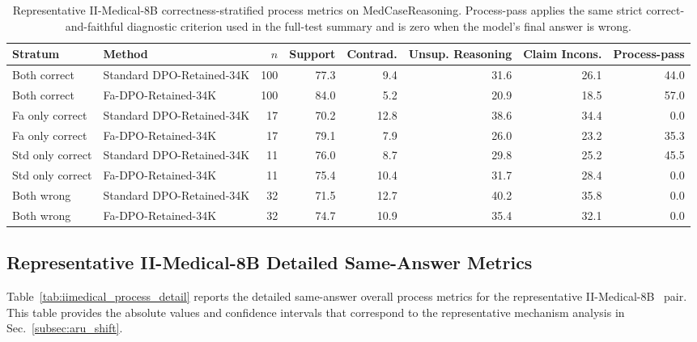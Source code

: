 \documentclass[a4paper,fleqn,doubleblind]{cas-sc}
\begin{document}
\begin{table}[p]
    \centering
    \scriptsize
    \setlength{\tabcolsep}{4pt}
    \caption{Representative II-Medical-8B correctness-stratified process metrics on MedCaseReasoning. Process-pass applies the same strict correct-and-faithful diagnostic criterion used in the full-test summary and is zero when the model's final answer is wrong.}
    \label{tab:iimedical_correctness_stratified_process}
    \begin{adjustbox}{max width=\textwidth}
    \begin{tabular}{llrrrrrr}
        \toprule
        \textbf{Stratum} & \textbf{Method} & \textbf{$n$} & \textbf{Support} & \textbf{Contrad.} & \textbf{Unsup. Reasoning} & \textbf{Claim Incons.} & \textbf{Process-pass} \\
        \midrule
        Both correct & Standard DPO-Retained-34K & 100 & 77.3 & 9.4 & 31.6 & 26.1 & 44.0 \\
        Both correct & Fa-DPO-Retained-34K & 100 & 84.0 & 5.2 & 20.9 & 18.5 & 57.0 \\
        Fa only correct & Standard DPO-Retained-34K & 17 & 70.2 & 12.8 & 38.6 & 34.4 & 0.0 \\
        Fa only correct & Fa-DPO-Retained-34K & 17 & 79.1 & 7.9 & 26.0 & 23.2 & 35.3 \\
        Std only correct & Standard DPO-Retained-34K & 11 & 76.0 & 8.7 & 29.8 & 25.2 & 45.5 \\
        Std only correct & Fa-DPO-Retained-34K & 11 & 75.4 & 10.4 & 31.7 & 28.4 & 0.0 \\
        Both wrong & Standard DPO-Retained-34K & 32 & 71.5 & 12.7 & 40.2 & 35.8 & 0.0 \\
        Both wrong & Fa-DPO-Retained-34K & 32 & 74.7 & 10.9 & 35.4 & 32.1 & 0.0 \\
        \bottomrule
    \end{tabular}
    \end{adjustbox}
\end{table}

\subsection{Representative II-Medical-8B Detailed Same-Answer Metrics}

Table~\ref{tab:iimedical_process_detail} reports the detailed same-answer overall process metrics for the representative II-Medical-8B~\cite{intelligentinternet2025iimedical8b} pair. This table provides the absolute values and confidence intervals that correspond to the representative mechanism analysis in Sec.~\ref{subsec:aru_shift}.
\end{document}
